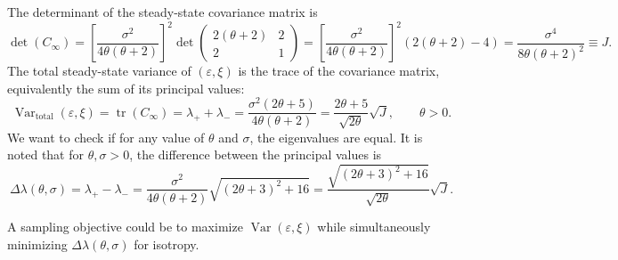 \documentclass[11pt]{article}
\begin{document}
The determinant of the steady-state covariance matrix is
\begin{equation}
    \det(C_\infty)
    =\left[\frac{\sigma^2}{4\theta(\theta+2)}\right]^2
    \det\begin{pmatrix}2(\theta+2)&2\\2&1\end{pmatrix}
    =\left[\frac{\sigma^2}{4\theta(\theta+2)}\right]^2
    \left(2(\theta+2)-4\right)
    =\frac{\sigma^4}{8\theta(\theta+2)^2}
    \equiv J.
\end{equation}
The total steady-state variance of $(\varepsilon,\xi)$ is the trace of the covariance matrix, equivalently the sum of its principal values:
\begin{equation}
    \operatorname{Var}_{\mathrm{total}}(\varepsilon,\xi)
    =\operatorname{tr}(C_\infty)
    =\lambda_++\lambda_-
    =\frac{\sigma^2(2\theta+5)}{4\theta(\theta+2)}
    =\frac{2\theta+5}{\sqrt{2\theta}}\sqrt{J},
    \qquad \theta>0.
\end{equation}
We want to check if for any value of $\theta$ and $\sigma$, the eigenvalues are equal. It is noted that for $\theta,\sigma>0$, the difference between the principal values is
\begin{equation}
    \Delta\lambda(\theta, \sigma)=\lambda_+-\lambda_-
    =\frac{\sigma^2}{4\theta(\theta+2)}
    \sqrt{(2\theta+3)^2+16}
    =\frac{\sqrt{(2\theta+3)^2+16}}{\sqrt{2\theta}}\sqrt{J}.
\end{equation}


A sampling objective could be to maximize $\operatorname{Var}(\varepsilon,\xi )$ while simultaneously minimizing $\Delta\lambda(\theta, \sigma)$ for isotropy.

\end{document}
